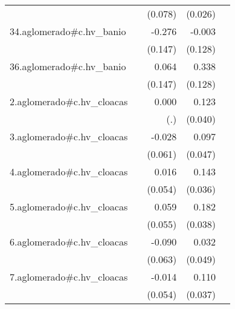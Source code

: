 {\begin{longtable}{l*{4}{D{.}{.}{-1}}}
            &                     &     (0.078)         &     (0.026)         &                     \\
\addlinespace
34.aglomerado#c.hv\_banio&                     &      -0.276         &      -0.003         &                     \\
            &                     &     (0.147)         &     (0.128)         &                     \\
\addlinespace
36.aglomerado#c.hv\_banio&                     &       0.064         &       0.338\sym{**} &                     \\
            &                     &     (0.147)         &     (0.128)         &                     \\
\addlinespace
2.aglomerado#c.hv\_cloacas&                     &       0.000         &       0.123\sym{**} &                     \\
            &                     &         (.)         &     (0.040)         &                     \\
\addlinespace
3.aglomerado#c.hv\_cloacas&                     &      -0.028         &       0.097\sym{*}  &                     \\
            &                     &     (0.061)         &     (0.047)         &                     \\
\addlinespace
4.aglomerado#c.hv\_cloacas&                     &       0.016         &       0.143\sym{***}&                     \\
            &                     &     (0.054)         &     (0.036)         &                     \\
\addlinespace
5.aglomerado#c.hv\_cloacas&                     &       0.059         &       0.182\sym{***}&                     \\
            &                     &     (0.055)         &     (0.038)         &                     \\
\addlinespace
6.aglomerado#c.hv\_cloacas&                     &      -0.090         &       0.032         &                     \\
            &                     &     (0.063)         &     (0.049)         &                     \\
\addlinespace
7.aglomerado#c.hv\_cloacas&                     &      -0.014         &       0.110\sym{**} &                     \\
            &                     &     (0.054)         &     (0.037)         &                     \\

\end{longtable}}
